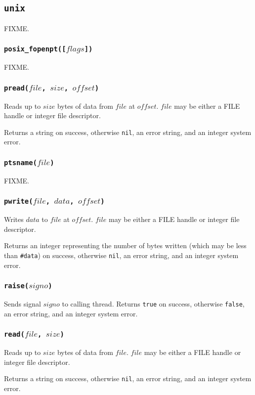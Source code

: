 \documentclass[11pt, oneside]{memoir}
\newcommand*{\true}[0]{\texttt{true}\xspace}
\newcommand*{\false}[0]{\texttt{false}\xspace}
\newcommand*{\nil}[0]{\texttt{nil}\xspace}
\newcommand*{\fn}[1]{\texttt{#1}\xspace}
\newcommand*{\otherwise}[1]{otherwise #1, an error string, and an integer system error}
\newcounter{toccols}
\newenvironment{Module}[1]{
	\subsection{\texttt{#1}}
	\addtocontents{toc}{
		\protect\begin{multicols}{\value{toccols}}
	}
}{
	\addtocontents{toc}{\protect\end{multicols}}
}
\begin{document}
\begin{Module}{unix}
FIXME.

\subsubsection[\fn{posix\_fopenpt}]{\fn{posix\_fopenpt([$flags$])}}

FIXME.

\subsubsection[\fn{pread}]{\fn{pread($file$, $size$, $offset$)}}

Reads up to $size$ bytes of data from $file$ at $offset$. $file$ may be either a FILE handle or integer file descriptor.

Returns a string on success, \otherwise{\nil}.

\subsubsection[\fn{ptsname}]{\fn{ptsname($file$)}}

FIXME.

\subsubsection[\fn{pwrite}]{\fn{pwrite($file$, $data$, $offset$)}}

Writes $data$ to $file$ at $offset$. $file$ may be either a FILE handle or integer file descriptor.

Returns an integer representing the number of bytes written (which may be less than \texttt{\#data}) on success, \otherwise{\nil}.

\subsubsection[\fn{raise}]{\fn{raise($signo$)}}

Sends signal $signo$ to calling thread. Returns \true on success, otherwise \false, an error string, and an integer system error.

\subsubsection[\fn{read}]{\fn{read($file$, $size$)}}

Reads up to $size$ bytes of data from $file$. $file$ may be either a FILE handle or integer file descriptor.

Returns a string on success, \otherwise{\nil}.


\end{Module}
\end{document}
